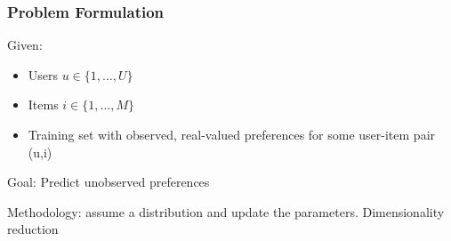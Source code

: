 \documentclass{article}
\begin{document}
\subsubsection{Problem Formulation}

Given: 

\begin{itemize}
\item Users $u\in \{1,...,U\}$
\item Items $i\in\{1,...,M\}$
\item Training set with observed, real-valued preferences for some user-item pair (u,i)
\end{itemize}

Goal: Predict unobserved preferences

Methodology: assume a distribution and update the parameters. Dimensionality reduction
\end{document}
